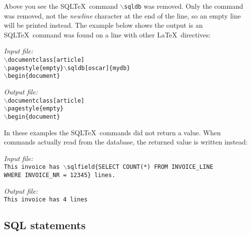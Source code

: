\documentclass{article}
\newcommand{\bs}{\ensuremath{\backslash}}
\newcommand{\vs}{\vspace{3mm}}
\begin{document}
\vs

Above you see the SQL\TeX\ command \texttt{\bs sqldb} was removed. Only the command was removed, not
the \textsl{newline} character at the end of the line, so an empty line will be printed instead.
The example below shows the output is an SQL\TeX\ command was found on a line with other \LaTeX\
directives:

\vs

\begin{minipage}[t]{0.5\textwidth}\textsl{Input file:}\\\texttt{\footnotesize{\bs documentclass[article] \\
\bs pagestyle\{empty\}\bs sqldb[oscar]\{mydb\} \\
\bs begin\{document\} \\
\hrulefill}}\end{minipage}\hfill\begin{minipage}[t]{0.5\textwidth}\textsl{Output file:}\\\texttt{\footnotesize{\bs documentclass[article] \\
\bs pagestyle\{empty\} \\
\bs begin\{document\} \\
}}\end{minipage}

\vs

In these examples the SQL\TeX\ commands did not return a value. When commands actually read from
the database, the returned value is written instead:

\vs

\begin{minipage}[t]{0.5\textwidth}\textsl{Input file:}\\\texttt{\footnotesize{This invoice has \bs sqlfield\{SELECT COUNT(*) FROM INVOICE\_LINE \\
WHERE INVOICE\_NR = 12345\} lines.\\
\hrulefill}}\end{minipage}\hfill\begin{minipage}[t]{0.5\textwidth}\textsl{Output file:}\\\texttt{\footnotesize{This invoice has 4 lines \\
}}\end{minipage}

\subsection{SQL statements}\label{sqlstatements}
\end{document}
